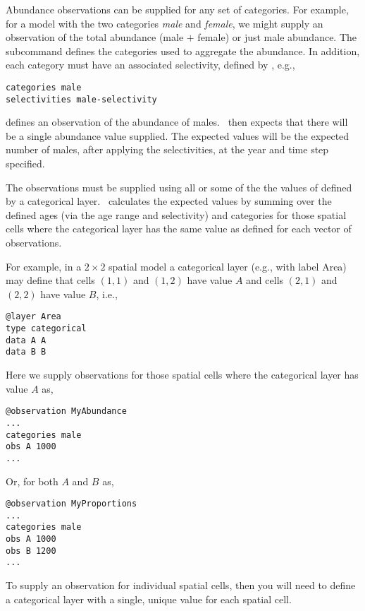 Abundance observations can be supplied for any set of categories. For example, for a model with the two categories \emph{male} and \emph{female}, we might supply an observation of the total abundance (male $+$ female) or just male abundance. The subcommand  defines the categories used to aggregate the abundance. In addition, each category must have an associated selectivity, defined by , e.g., 

\begin{verbatim}
categories male
selectivities male-selectivity
\end{verbatim}

defines an observation of the abundance of males. \SPM\ then expects that there will be a single abundance value supplied. The expected values will be the expected number of males, after applying the selectivities, at the year and time step specified. 

The observations must be supplied using all or some of the the values of defined by a categorical layer. \SPM\ calculates the expected values by summing over the defined ages (via the age range and selectivity) and categories for those spatial cells where the categorical layer has the same value as defined for each vector of observations.

For example, in a $2 \times 2$ spatial model a categorical layer (e.g., with label Area) may define that cells $(1,1)$ and $(1,2)$ have value $A$ and cells $(2,1)$ and $(2,2)$ have value $B$, i.e.,

\begin{verbatim}
@layer Area
type categorical
data A A 
data B B
\end{verbatim}

Here we supply observations for those spatial cells where the categorical layer has value $A$ as, 

\begin{verbatim}
@observation MyAbundance
...
categories male 
obs A 1000
...
\end{verbatim}

Or, for both $A$ and $B$ as,

\begin{verbatim}
@observation MyProportions
...
categories male
obs A 1000
obs B 1200
...
\end{verbatim}

To supply an observation for individual spatial cells, then you will need to define a categorical layer with a single, unique value for each spatial cell. 

